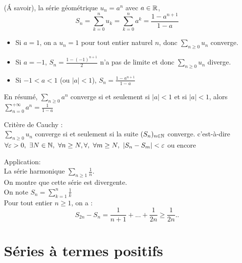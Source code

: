 \documentclass[../main.tex]{subfile}
\begin{document}
\begin{exerc}
	(\'A savoir), la série géométrique $u_n = a^n$ avec $a \in \mathbb{R}$, \\
	$$S_n = \sum\limits_{k = 0}^n u_k = \sum\limits_{k = 0}^n a^k = \frac{1 - a^{n + 1}}{1 - a}$$
\begin{itemize}	
	\item Si $a = 1$, on a $u_n = 1$ pour tout entier naturel $n$, 
	donc $\sum\limits_{n \geq 0} u_n$ converge.

	\item Si $a=-1$, $S_n = \frac{1-(-1)^{n+1}}{2}$ n'a pas de limite et donc $\sum\limits_{n \geq 0} u_n$ diverge.

	\item Si $-1 < a < 1$ (ou $|a| < 1$), $S_n = \frac{1 - a^{n+1}}{1-a}$ %
\end{itemize}
\end{exerc}

En résumé, $\sum\limits_{n \geq 0} a^n$ converge si et seulement si $|a| < 1$ et si $|a| < 1$, alors $\sum\limits_{n=0}^{+\infty} a^n = \frac{1}{1 - a}$

\begin{prop}
	Critère de Cauchy : \\
	$\sum\limits_{n \geq 0} u_n$ converge si et seulement si la suite $(S_n)_{n \in \mathbb{N}}$ converge. c'est-à-dire $\forall \varepsilon > 0, \ \exists N \in \NN, \ \forall n \geq N, \forall, \ \forall m \geq N, \ |S_n - S_m| < \varepsilon$ ou encore %
\end{prop}

Application:\\
La série harmonique $\sum\limits_{n \geq 1} \frac{1}{n}$.\\
On montre que cette série est divergente.\\
On note $S_n = \sum\limits_{k = 1}^n \frac{1}{k}$\\

Pour tout entier $n \geq 1$, on a : \\
$$S_{2n} - S_n = \frac{1}{n + 1} + ... + \frac{1}{2n} \geq \frac{1}{2n} .. $$











\section{Séries à termes positifs}
\end{document}
